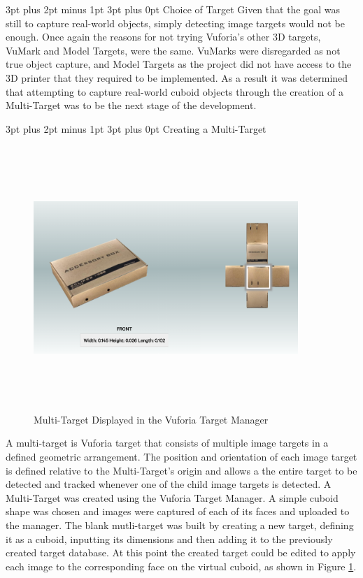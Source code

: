 \documentclass[12pt,a4paper,oneside]{article}
\makeatletter
\renewcommand\paragraph{\@startsection {paragraph}{1}{0mm} %
	                           {3pt plus 2pt minus 1pt} %
	                           {3pt plus 0pt} %
	                           {\normalfont}}
\makeatother
\begin{document}
\paragraph{Choice of Target}
Given that the goal was still to capture real-world objects, simply detecting image targets would not be enough. Once again the reasons for not trying Vuforia's other 3D targets, VuMark and Model Targets, were the same. VuMarks were disregarded as not true object capture, and Model Targets as the project did not have access to the 3D printer that they required to be implemented. As a result it was determined that attempting to capture real-world cuboid objects through the creation of a Multi-Target was to be the next stage of the development.

\paragraph{Creating a Multi-Target}
\begin{figure}[!h]
	\centering
	\includegraphics[width=10cm,height=10cm,keepaspectratio]{images/accessorybox}
	\caption{Multi-Target Displayed in the Vuforia Target Manager}
	\label{fig_accessorybox}
\end{figure}
A multi-target is Vuforia target that consists of multiple image targets in a defined geometric arrangement. The position and orientation of each image target is defined relative to the Multi-Target's origin and allows a the entire target to be detected and tracked whenever one of the child image targets is detected. A Multi-Target was created using the Vuforia Target Manager. A simple cuboid shape was chosen and images were captured of each of its faces and uploaded to the manager. The blank mutli-target was built by creating a new target, defining it as a cuboid, inputting its dimensions and then adding it to the previously created target database. At this point the created target could be edited to apply each image to the corresponding face on the virtual cuboid, as shown in Figure \ref{fig_accessorybox}. 
\end{document}
